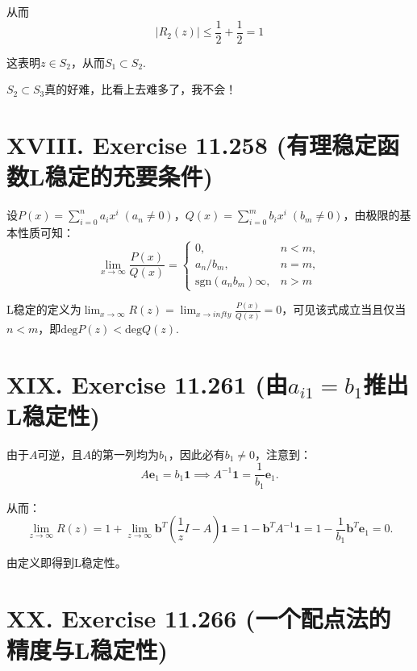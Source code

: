 \documentclass[twoside,a4paper]{article}
\begin{document}
从而
\begin{equation*}
    |R_2(z)| \leq \frac{1}{2} + \frac{1}{2} = 1
\end{equation*}

这表明$z\in S_2$，从而$S_1\subset S_2$.

$S_2\subset S_3$真的好难，比看上去难多了，我不会！

\section*{XVIII. Exercise 11.258 (有理稳定函数L稳定的充要条件)}

\;\;\;\;\;\;设$P(x)=\sum_{i=0}^n a_ix^i\;(a_n\neq 0)$，$Q(x)=\sum_{i=0}^m b_ix^i\;(b_m\neq 0)$，由极限的基本性质可知：
\begin{equation*}
    \lim_{x\to \infty} \frac{P(x)}{Q(x)}=\left\{
        \begin{array}{ll}
            0, & n<m,\\
            a_n/b_m, & n=m,\\
            \text{sgn}(a_nb_m)\infty, & n>m
        \end{array}
    \right.
\end{equation*}

L稳定的定义为$\lim_{x\to \infty} R(z)=\lim_{x\to infty} \frac{P(x)}{Q(x)}=0$，可见该式成立当且仅当$n<m$，即$\text{deg}P(z)<\text{deg}Q(z)$.

\section*{XIX. Exercise 11.261 (由$a_{i1}=b_1$推出L稳定性)}

\;\;\;\;\;\;由于$A$可逆，且$A$的第一列均为$b_1$，因此必有$b_1\neq 0$，注意到：
\begin{equation*}
    A\mathbf{e}_1=b_1\mathbf{1}\implies A^{-1}\mathbf{1}=\frac{1}{b_1}\mathbf{e}_1.
\end{equation*}

从而：
\begin{equation*}
    \lim_{z\to\infty} R(z)=1+\lim_{z\to\infty}\mathbf{b}^T\left(\frac{1}{z}I-A\right)\mathbf{1}=1-\mathbf{b}^TA^{-1}\mathbf{1}=1-\frac{1}{b_1}\mathbf{b}^T\mathbf{e}_1=0.
\end{equation*}

由定义即得到L稳定性。

\section*{XX. Exercise 11.266 (一个配点法的精度与L稳定性)}
\end{document}
